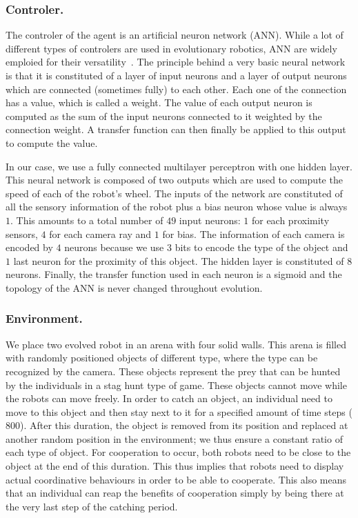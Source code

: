     \subsubsection{Controler.} The controler of the agent is an artificial neuron network (ANN). While a lot of different types of controlers are used in evolutionary robotics, ANN are widely emploied for their versatility~\parencite{Doncieux2015}. The principle behind a very basic neural network is that it is constituted of a layer of input neurons and a layer of output neurons which are connected (sometimes fully) to each other. Each one of the connection has a value, which is called a weight. The value of each output neuron is computed as the sum of the input neurons connected to it weighted by the connection weight. A transfer function can then finally be applied to this output to compute the value. 

    In our case, we use a fully connected multilayer perceptron with one hidden layer. This neural network is composed of two outputs which are used to compute the speed of each of the robot's wheel. The inputs of the network are constituted of all the sensory information of the robot plus a bias neuron whose value is always $1$. This amounts to a total number of $49$ input neurons: $1$ for each proximity sensors, $4$ for each camera ray and $1$ for bias. The information of each camera is encoded by $4$ neurons because we use $3$ bits to encode the type of the object and $1$ last neuron for the proximity of this object. The hidden layer is constituted of $8$ neurons. Finally, the transfer function used in each neuron is a sigmoid and the topology of the ANN is never changed throughout evolution.

    \subsubsection{Environment.} We place two evolved robot in an arena with four solid walls. This arena is filled with randomly positioned objects of different type, where the type can be recognized by the camera. These objects represent the prey that can be hunted by the individuals in a stag hunt type of game. These objects cannot move while the robots can move freely. In order to catch an object, an individual need to move to this object and then stay next to it for a specified amount of time steps ($800$). After this duration, the object is removed from its position and replaced at another random position in the environment; we thus ensure a constant ratio of each type of object. For cooperation to occur, both robots need to be close to the object at the end of this duration. This thus implies that robots need to display actual coordinative behaviours in order to be able to cooperate. This also means that an individual can reap the benefits of cooperation simply by being there at the very last step of the catching period.

